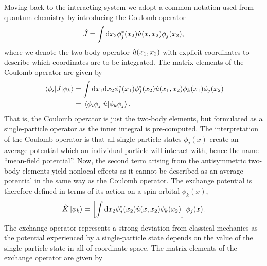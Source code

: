            Moving back to the interacting system we adopt a common notation
            used from quantum chemistry \cite{szabo1996modern} by introducing
            the Coulomb operator
            \begin{align}
                \hat{J}
                = \int \dd x_2
                \phi^{*}_j(x_2)\hat{u}(x, x_2)
                \phi_j(x_2),
                \label{eq:coulomb-operator}
            \end{align}
            where we denote the two-body operator $\hat{u}(x_1, x_2)$ with
            explicit coordinates to describe which coordinates are to be
            integrated.
            The matrix elements of the Coulomb operator are given by
            \begin{align}
                \mel*{\phi_i}{\hat{J}}{\phi_k}
                &= \int\dd x_1\dd x_2
                \phi^{*}_i(x_1)\phi^{*}_j(x_2)
                \hat{u}(x_1, x_2)
                \phi_k(x_1)\phi_j(x_2)
                \\
                &=
                \mel*{\phi_i\phi_j}{\hat{u}}{\phi_k\phi_j}.
            \end{align}
            That is, the Coulomb operator is just the two-body elements, but
            formulated as a single-particle operator as the inner integral is
            pre-computed.
            The interpretation of the Coulomb operator is that all
            single-particle states $\phi_j(x)$ create an average potential
            which an individual particle will interact with, hence the name
            ``mean-field potential''.
            Now, the second term arising from the antisymmetric two-body
            elements yield nonlocal effects as it cannot be described as an
            average potential in the same way as the Coulomb operator.
            The exchange potential is therefore defined in terms of its action
            on a spin-orbital $\phi_k(x)$,
            \begin{align}
                \hat{K}\ket*{\phi_k}
                = \left[ 
                    \int\dd x_2 \phi^{*}_j(x_2)\hat{u}(x, x_2)\phi_k(x_2)
                 \right]\phi_j(x).
                \label{eq:exchange-operator}
            \end{align}
            The exchange operator represents a strong deviation from classical
            mechanics as the potential experienced by a single-particle state
            depends on the value of the single-particle state in all of
            coordinate space.
            The matrix elements of the exchange operator are given by
